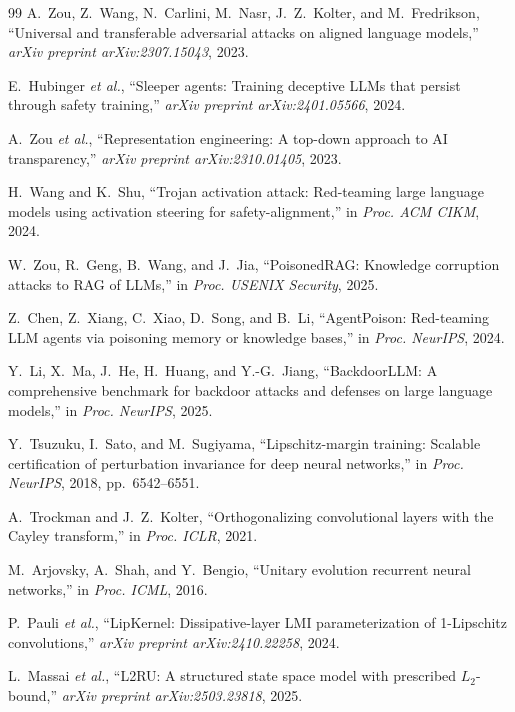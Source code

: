 \documentclass[journal,a4paper,10pt]{IEEEtran}
\theoremstyle{definition}
\theoremstyle{remark}
\begin{document}
\begin{thebibliography}{99}
A.~Zou, Z.~Wang, N.~Carlini, M.~Nasr, J.~Z.~Kolter, and M.~Fredrikson, ``Universal and transferable adversarial attacks on aligned language models,'' \emph{arXiv preprint arXiv:2307.15043}, 2023.

E.~Hubinger \emph{et al.}, ``Sleeper agents: Training deceptive {LLMs} that persist through safety training,'' \emph{arXiv preprint arXiv:2401.05566}, 2024.

A.~Zou \emph{et al.}, ``Representation engineering: A top-down approach to AI transparency,'' \emph{arXiv preprint arXiv:2310.01405}, 2023.

H.~Wang and K.~Shu, ``Trojan activation attack: Red-teaming large language models using activation steering for safety-alignment,'' in \emph{Proc. ACM CIKM}, 2024.

W.~Zou, R.~Geng, B.~Wang, and J.~Jia, ``{PoisonedRAG}: Knowledge corruption attacks to RAG of {LLMs},'' in \emph{Proc. USENIX Security}, 2025.

Z.~Chen, Z.~Xiang, C.~Xiao, D.~Song, and B.~Li, ``{AgentPoison}: Red-teaming {LLM} agents via poisoning memory or knowledge bases,'' in \emph{Proc. NeurIPS}, 2024.


Y.~Li, X.~Ma, J.~He, H.~Huang, and Y.-G.~Jiang, ``{BackdoorLLM}: A comprehensive benchmark for backdoor attacks and defenses on large language models,'' in \emph{Proc. NeurIPS}, 2025.

Y.~Tsuzuku, I.~Sato, and M.~Sugiyama, ``Lipschitz-margin training: Scalable certification of perturbation invariance for deep neural networks,'' in \emph{Proc. NeurIPS}, 2018, pp.~6542--6551.

A.~Trockman and J.~Z.~Kolter, ``Orthogonalizing convolutional layers with the {Cayley} transform,'' in \emph{Proc. ICLR}, 2021.

M.~Arjovsky, A.~Shah, and Y.~Bengio, ``Unitary evolution recurrent neural networks,'' in \emph{Proc. ICML}, 2016.

P.~Pauli \emph{et al.}, ``{LipKernel}: Dissipative-layer LMI parameterization of 1-{Lipschitz} convolutions,'' \emph{arXiv preprint arXiv:2410.22258}, 2024.

L.~Massai \emph{et al.}, ``{L2RU}: A structured state space model with prescribed $L_2$-bound,'' \emph{arXiv preprint arXiv:2503.23818}, 2025.


\end{thebibliography}
\end{document}
